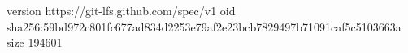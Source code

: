 version https://git-lfs.github.com/spec/v1
oid sha256:59bd972c801fc677ad834d2253e79af2e23bcb7829497b71091caf5c5103663a
size 194601
